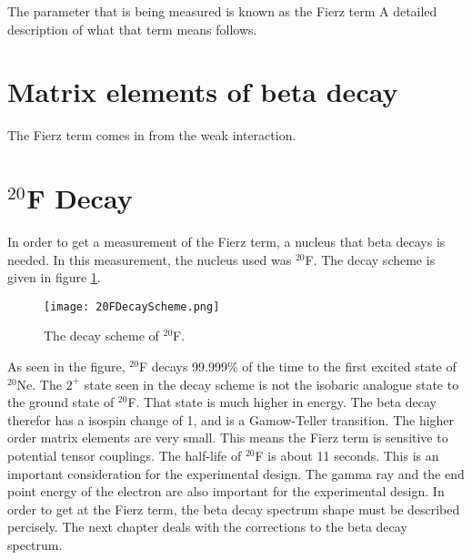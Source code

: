 The parameter that is being measured is known as the Fierz term %
A detailed description of what that term means follows.

\section{Matrix elements of beta decay}
The Fierz term comes in from the weak interaction. 


\section{$^{20}$F Decay}
In order to get a measurement of the Fierz term, a nucleus that beta decays is needed.
In this measurement, the nucleus used was $^{20}$F.
The decay scheme is given in figure \ref{fig:DecayScheme}.

\begin{figure}[!htb]
	\centerline{\texttt{[image: 20FDecayScheme.png]}}
	\caption{The decay scheme of $^{20}$F.}
	\label{fig:DecayScheme}
\end{figure}

As seen in the figure, $^{20}$F decays 99.999\% of the time to the first excited state of $^{20}$Ne.
The $2^{+}$ state seen in the decay scheme is not the isobaric analogue state to the ground state of $^{20}$F.
That state is much higher in energy.
The beta decay therefor has a isospin change of 1, and is a Gamow-Teller transition.
The higher order matrix elements are very small.
This means the Fierz term is sensitive to potential tensor couplings.
The half-life of $^{20}$F is about 11 seconds. 
This is an important consideration for the experimental design.
The gamma ray and the end point energy of the electron are also important for the experimental design.
In order to get at the Fierz term, the beta decay spectrum shape must be described percisely.
The next chapter deals with the corrections to the beta decay spectrum.  

